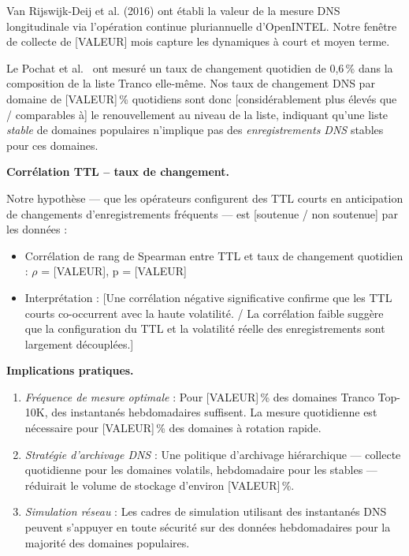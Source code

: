 Van Rijswijk-Deij et al. (2016) ont établi la valeur de la mesure DNS longitudinale via l'opération continue pluriannuelle d'OpenINTEL. Notre fenêtre de collecte de [VALEUR] mois capture les dynamiques à court et moyen terme.

Le Pochat et al.~\cite{LePochat2019} ont mesuré un taux de changement quotidien de 0,6\,\% dans la composition de la liste Tranco elle-même. Nos taux de changement DNS par domaine de [VALEUR]\,\% quotidiens sont donc [considérablement plus élevés que / comparables à] le renouvellement au niveau de la liste, indiquant qu'une liste \textit{stable} de domaines populaires n'implique pas des \textit{enregistrements DNS} stables pour ces domaines.

\textbf{Corrélation TTL -- taux de changement.}

Notre hypothèse --- que les opérateurs configurent des TTL courts en anticipation de changements d'enregistrements fréquents --- est [soutenue / non soutenue] par les données :

\begin{itemize}
  \item Corrélation de rang de Spearman entre TTL et taux de changement quotidien : $\rho$ = [VALEUR], p = [VALEUR]
  \item Interprétation : [Une corrélation négative significative confirme que les TTL courts co-occurrent avec la haute volatilité. / La corrélation faible suggère que la configuration du TTL et la volatilité réelle des enregistrements sont largement découplées.]
\end{itemize}

\textbf{Implications pratiques.}

\begin{enumerate}
  \item \textit{Fréquence de mesure optimale} : Pour [VALEUR]\,\% des domaines Tranco Top-10K, des instantanés hebdomadaires suffisent. La mesure quotidienne est nécessaire pour [VALEUR]\,\% des domaines à rotation rapide.
  \item \textit{Stratégie d'archivage DNS} : Une politique d'archivage hiérarchique --- collecte quotidienne pour les domaines volatils, hebdomadaire pour les stables --- réduirait le volume de stockage d'environ [VALEUR]\,\%.
  \item \textit{Simulation réseau} : Les cadres de simulation utilisant des instantanés DNS peuvent s'appuyer en toute sécurité sur des données hebdomadaires pour la majorité des domaines populaires.
\end{enumerate}
\bigskip
